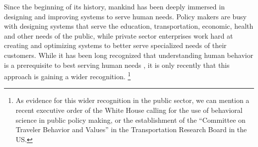 Since the beginning of its history, mankind has been deeply immersed in 
	designing and improving systems to serve human needs.
Policy makers are busy with designing 
	systems that serve the education, transportation, economic, health and other 
	needs of the public,
while private sector enterprises work hard at creating 
	and optimizing systems to better serve  
	specialized needs of their customers.
While it has been long recognized that 
	understanding human behavior is a prerequisite 
	to best serving human needs \cite{Simon:1959kd},
	it is only recently that this approach is gaining a wider recognition.%
\footnote{
As evidence for this wider recognition in the public sector,
we can mention a recent executive order of the White House
calling for the use of behavioral science in public policy making, 
or the establishment of the ``Committee on Traveler Behavior and Values'' in the Transportation
Research Board in the US.}

